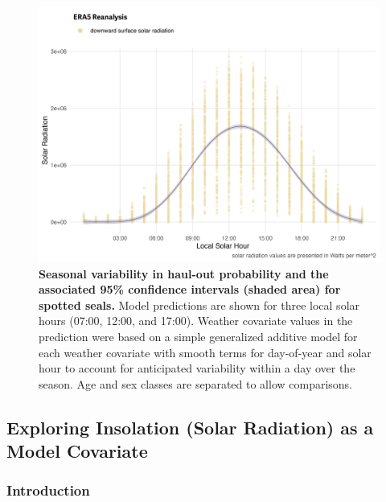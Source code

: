 \documentclass[fleqn,10pt,lineno]{wlpeerj} %
\begin{document}
\begin{figure}
\includegraphics[width=1\linewidth]{../figures/Figure-015} \caption{\textbf{Seasonal variability in haul-out probability and the associated 95\% confidence intervals (shaded area) for spotted seals.} \linebreak Model predictions are shown for three local solar hours (07:00, 12:00, and 17:00). Weather covariate values in the prediction were based on a simple generalized additive model for each weather covariate with smooth terms for day-of-year and solar hour to account for anticipated variability within a day over the season. Age and sex classes are separated to allow comparisons.}\label{fig:spottedPredSE}
\end{figure}

\clearpage

\subsection{Exploring Insolation (Solar Radiation) as a Model Covariate}\label{exploring-insolation-solar-radiation-as-a-model-covariate}

\subsubsection{Introduction}\label{introduction-1}
\end{document}
